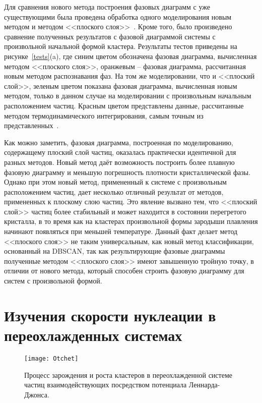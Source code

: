 Для сравнения нового метода построения фазовых диаграмм с уже существующими была проведена обработка одного моделирования новым методом и методом <<плоского слоя>>~\cite{10.1021/jp806127j, 10.1021/jp1117213}.
Кроме того, было произведено сравнение полученных результатов с фазовой диаграммой системы с произвольной начальной формой кластера.
Результаты тестов приведены на рисунке~\ref{tests}(a), где синим цветом обозначена фазовая диаграмма, вычисленная методом <<плоского слоя>>, оранжевым -- фазовая диаграмма, рассчитанная новым методом распознавания фаз.
На том же моделировании, что и <<плоский слой>>, зеленым цветом показана фазовая диаграмма, вычисленная новым методом, только в данном случае на моделировании с произвольным начальным расположением частиц.
Красным цветом представлены данные, рассчитанные методом термодинамического интегрирования, самым точным из представленных~\cite{10.1080/00268976.2019.1699185}.

Как можно заметить, фазовая диаграмма, построенная по моделированию, содержащему плоский слой частиц, оказалась практически идентичной для разных методов.
Новый метод даёт возможность построить более плавную фазовую диаграмму и меньшую погрешность плотности кристаллической фазы.
Однако при этом новый метод, примененный к системе с произвольным расположением частиц, дает несколько отличный результат от методов, примененных к плоскому слою частиц.
Это явление вызвано тем, что <<плоский слой>> частиц более стабильный и может находится в состоянии перегретого кристалла, в то время как на кластерах произвольной формы зародыши плавления начинают появляться при меньшей температуре.
Данный факт делает метод <<плоского слоя>> не таким универсальным, как новый метод классификации, основанный на DBSCAN, так как результирующие фазовые диаграммы полученные методом <<плоского слоя>> имеют завышенную тройную точку, в отличии от нового метода, который способен строить фазовую диаграмму для систем с произвольной формой.


\section{Изучения скорости нуклеации в переохлажденных системах}
\label{PRIMe-SecNucleation}

\begin{figure}[!t]
  \centering
  \texttt{[image: Otchet]}
  \caption{Процесс зарождения и роста кластеров в переохлажденной системе частиц взаимодействующих посредством потенциала Леннарда-Джонса.}
  \label{otchet}
\end{figure}


